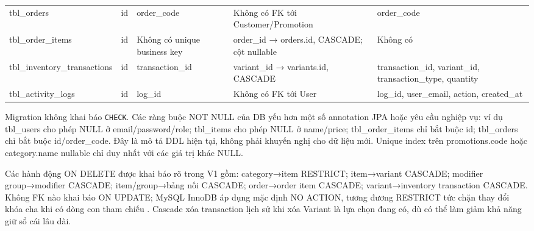 \documentclass[12pt,a4paper,oneside]{report}
\begin{document}
\begin{longtable}{@{}D{2.2cm}D{1.2cm}D{3.1cm}D{4.1cm}D{4.1cm}@{}}
tbl\_\allowbreak orders & id & order\_\allowbreak code & Không có FK tới Customer/Promotion & order\_\allowbreak code\\
tbl\_\allowbreak order\_\allowbreak items & id & Không có unique business key & order\_\allowbreak id → orders.id, CASCADE; cột nullable & Không có\\
tbl\_\allowbreak inventory\_\allowbreak transactions & id & transaction\_\allowbreak id & variant\_\allowbreak id → variants.id, CASCADE & transaction\_\allowbreak id, variant\_\allowbreak id, transaction\_\allowbreak type, quantity\\
tbl\_\allowbreak activity\_\allowbreak logs & id & log\_\allowbreak id & Không có FK tới User & log\_\allowbreak id, user\_\allowbreak email, action, created\_\allowbreak at\\
\end{longtable}\normalsize

Migration không khai báo \texttt{CHECK}. Các ràng buộc NOT NULL của DB yếu hơn một số annotation JPA hoặc yêu cầu nghiệp vụ: ví dụ tbl\_users cho phép NULL ở email/password/role; tbl\_items cho phép NULL ở name/price; tbl\_order\_items chỉ bắt buộc id; tbl\_orders chỉ bắt buộc id/order\_code. Đây là mô tả DDL hiện tại, không phải khuyến nghị cho dữ liệu mới. Unique index trên promotions.code hoặc category.name nullable chỉ duy nhất với các giá trị khác NULL.

Các hành động ON DELETE được khai báo rõ trong V1 gồm: category→item RESTRICT; item→variant CASCADE; modifier group→modifier CASCADE; item/group→bảng nối CASCADE; order→order item CASCADE; variant→inventory transaction CASCADE. Không FK nào khai báo ON UPDATE; MySQL InnoDB áp dụng mặc định NO ACTION, tương đương RESTRICT tức chặn thay đổi khóa cha khi có dòng con tham chiếu \cite{mysqlfk}. Cascade xóa transaction lịch sử khi xóa Variant là lựa chọn đang có, dù có thể làm giảm khả năng giữ sổ cái lâu dài.
\end{document}
